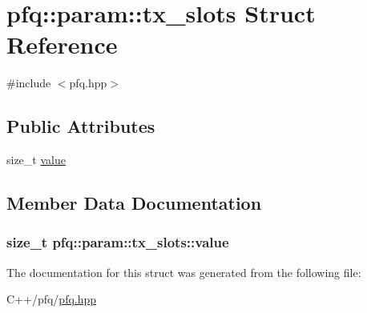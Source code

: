 \hypertarget{structpfq_1_1param_1_1tx__slots}{}\section{pfq\+:\+:param\+:\+:tx\+\_\+slots Struct Reference}
\label{structpfq_1_1param_1_1tx__slots}


{\ttfamily \#include $<$pfq.\+hpp$>$}

\subsection*{Public Attributes}
\begin{DoxyCompactItemize}
\item 
size\+\_\+t \hyperlink{structpfq_1_1param_1_1tx__slots_a0211960e3e5bfab53d2ed6bb96445723}{value}
\end{DoxyCompactItemize}


\subsection{Member Data Documentation}
\subsubsection[{\texorpdfstring{value}{value}}]{\setlength{\rightskip}{0pt plus 5cm}size\+\_\+t pfq\+::param\+::tx\+\_\+slots\+::value}\hypertarget{structpfq_1_1param_1_1tx__slots_a0211960e3e5bfab53d2ed6bb96445723}{}\label{structpfq_1_1param_1_1tx__slots_a0211960e3e5bfab53d2ed6bb96445723}


The documentation for this struct was generated from the following file\+:\begin{DoxyCompactItemize}
\item 
C++/pfq/\hyperlink{pfq_8hpp}{pfq.\+hpp}\end{DoxyCompactItemize}
